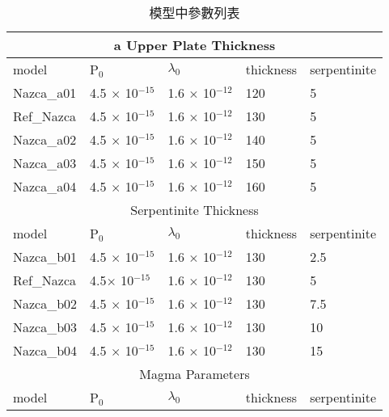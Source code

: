 \begin{table}[htp]\large
    \caption[模型參數列表]{模型中參數列表}
    \label{模型參數列表}
    \renewcommand{\arraystretch}{1.2}
    \centering
    \begin{tabular}{|lllll|}
        \hline
        \multicolumn{5}{|c|}{a Upper Plate Thickness}                                                 \\ \hline
        model        & P$_0$                   & $\lambda_0$             & thickness & serpentinite \\ \hline
        Nazca\_a01 & 4.5 $\times$ 10$^{-15}$ & 1.6 $\times$ 10$^{-12}$ & 120       & 5            \\
        Ref\_Nazca   & 4.5 $\times$ 10$^{-15}$ & 1.6 $\times$ 10$^{-12}$ & 130       & 5            \\
        Nazca\_a02 & 4.5 $\times$ 10$^{-15}$ & 1.6 $\times$ 10$^{-12}$ & 140       & 5            \\
        Nazca\_a03 & 4.5 $\times$ 10$^{-15}$ & 1.6 $\times$ 10$^{-12}$ & 150       & 5            \\
        Nazca\_a04 & 4.5 $\times$ 10$^{-15}$ & 1.6 $\times$ 10$^{-12}$ & 160       & 5            \\ \hline
        \multicolumn{5}{|c|}{Serpentinite Thickness}                                                \\ \hline
        model        & P$_0$                   & $\lambda_0$             & thickness & serpentinite \\ \hline
        Nazca\_b01 & 4.5 $\times$ 10$^{-15}$ & 1.6 $\times$ 10$^{-12}$ & 130       & 2.5          \\
        Ref\_Nazca   & 4.5$\times$ 10$^{-15}$  & 1.6 $\times$ 10$^{-12}$ & 130       & 5            \\
        Nazca\_b02 & 4.5 $\times$ 10$^{-15}$ & 1.6 $\times$ 10$^{-12}$ & 130       & 7.5          \\
        Nazca\_b03 & 4.5 $\times$ 10$^{-15}$ & 1.6 $\times$ 10$^{-12}$ & 130       & 10           \\
        Nazca\_b04 & 4.5 $\times$ 10$^{-15}$ & 1.6 $\times$ 10$^{-12}$ & 130       & 15           \\ \hline
        \multicolumn{5}{|c|}{Magma Parameters}                                                      \\ \hline
        model        & P$_0$                   & $\lambda_0$             & thickness & serpentinite \\ \hline

\end{tabular}
\end{table}
